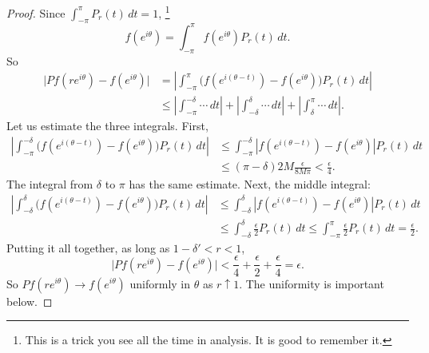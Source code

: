 \documentclass[12pt,openany]{book}
\newcommand{\sabs}[1]{\lvert {#1} \rvert}
\newcommand{\abs}[1]{\left\lvert {#1} \right\rvert}
\theoremstyle{plain}
\theoremstyle{remark}
\theoremstyle{definition}
\theoremstyle{exercise}
\theoremstyle{example}
\begin{document}
\begin{proof}
Since
$\int_{-\pi}^\pi P_r(t) \, dt = 1$,%
\footnote{This is a trick you see all the time in analysis.
It is good to remember it.}
\begin{equation*}
f(e^{i\theta})=
\int_{-\pi}^\pi f(e^{i\theta}) P_r(t) \, dt .
\end{equation*}
So
\begin{equation*}
\begin{split}
\sabs{
Pf(r e^{i\theta} ) - f(e^{i\theta})
}
& =
\abs{
\int_{-\pi}^{\pi} \bigl( f(e^{i(\theta-t)})-f(e^{i\theta}) \bigr) P_r(t) \, dt
}
\\
& \leq 
\abs{
\int_{-\pi}^{-\delta} \cdots \, dt
}
+
\abs{
\int_{-\delta}^{\delta} \cdots \, dt
}
+
\abs{
\int_{\delta}^\pi \cdots \, dt
} .
\end{split}
\end{equation*}
Let us estimate the three integrals.
First,
\begin{equation*}
\begin{split}
\abs{
\int_{-\pi}^{-\delta} \bigl( f(e^{i(\theta-t)})-f(e^{i\theta}) \bigr) P_r(t) \, dt
}
& \leq
\int_{-\pi}^{-\delta} \abs{ f(e^{i(\theta-t)})-f(e^{i\theta}) }
P_r(t) \, dt
\\
& \leq (\pi-\delta) 2M \frac{\epsilon}{8M\pi} < \frac{\epsilon}{4} .
\end{split}
\end{equation*}
The integral from $\delta$ to $\pi$ has the same estimate.
Next, the middle integral:
\begin{equation*}
\begin{split}
\abs{
\int_{-\delta}^{\delta} \bigl( f(e^{i(\theta-t)})-f(e^{i\theta}) \bigr) P_r(t) \, dt
}
& \leq
\int_{-\delta}^{\delta} \abs{f(e^{i(\theta-t)})-f(e^{i\theta})}
P_r(t) \, dt
\\
& \leq
\int_{-\delta}^{\delta} \frac{\epsilon}{2} P_r(t) \, dt
\leq
\int_{-\pi}^{\pi} \frac{\epsilon}{2} P_r(t) \, dt
=\frac{\epsilon}{2} .
\end{split}
\end{equation*}
Putting it all together, as long as $1-\delta' < r < 1$,
\begin{equation*}
\sabs{
Pf(r e^{i\theta} ) - f(e^{i\theta})
} < \frac{\epsilon}{4} + \frac{\epsilon}{2} + \frac{\epsilon}{4} =
\epsilon.
\end{equation*}
So $Pf(re^{i\theta}) \to f(e^{i\theta})$ uniformly in $\theta$
as $r \uparrow 1$.
The uniformity is important below.


\end{proof}
\end{document}
